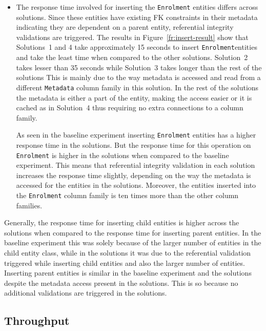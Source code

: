 \begin{itemize}
  \item The response time involved for inserting the \texttt{Enrolment}
  entities differs across solutions. Since these entities have existing \ac{FK}
  constraints in their metadata indicating they are dependent on a parent
  entity, referential integrity validations are triggered. The results in
  Figure~\ref{fr:insert-result} show that Solutions~1 and 4 take approximately 15 seconds to
  insert  \texttt{Enrolment}entities and take the least time when compared
  to the other solutions.  Solution~2 takes lesser than 35 seconds while
  Solution~3 takes longer than the rest of the solutions 
  This is mainly due to the way metadata is accessed and read from  a different
  \texttt{Metadata} column family in this solution. In the rest of the solutions the 
  metadata is either a part of the entity, making the access easier or it is
  cached as in Solution~4 thus requiring no extra connections to a column family. 
  
  As seen in the baseline experiment inserting \texttt{Enrolment} entities  has
  a higher response time in the solutions. But the response time for this
  operation on \texttt{Enrolment} is higher in the solutions when compared to
  the baseline experiment. This means that referential integrity validation in
  each solution increases the response time slightly, depending on the way the
  metadata is accessed for the entities in the solutions. Moreover, the entities
  inserted into the \texttt{Enrolment} column family is ten times more than the
  other column families.
\end{itemize}

Generally, the response time for inserting child entities is higher across the
solutions when compared to the response time for inserting parent entities. In
the baseline experiment this was solely because of the larger number of entities
in the child entity class, while in the solutions it was due to the referential
validation triggered while inserting child entities and also the larger number
of entities. Inserting parent entities is similar in the baseline
experiment and the solutions despite the metadata access present in the
solutions. This is so because no additional validations are triggered in the
solutions. 


\subsection{Throughput}

